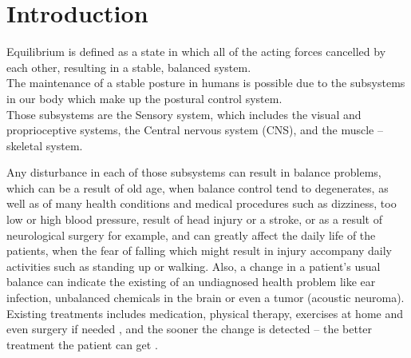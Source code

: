 \documentclass[twoside]{ctuthesis}
\theoremstyle{plain}
\theoremstyle{definition}
\theoremstyle{note}
\begin{document}
\maketitle

\section{Introduction}

Equilibrium is defined as a state in which all of the acting forces cancelled by each other, resulting in a stable, balanced system\cite{Physio}.\\
The maintenance of a stable posture in humans is possible due to the subsystems in our body which make up the postural control system.\\
Those subsystems are the Sensory system, which includes the visual and proprioceptive systems, the Central nervous system (CNS), and the muscle – skeletal system\cite{Control}.\\\par

Any disturbance in each of those subsystems can result in balance problems, which can be a result of old age, when balance control tend to degenerates\cite{Control}, as well as of many health conditions and medical procedures such as dizziness, too low or high blood pressure, result of head injury or a stroke, or as a result of neurological surgery for example\cite{Healthline}, and can greatly affect the daily life of the patients, when the fear of falling which might result in injury accompany daily activities such as standing up or walking\cite{Control}. Also, a change in a patient's usual balance can indicate the existing of an undiagnosed health problem like ear infection, unbalanced chemicals in the brain or even a tumor (acoustic neuroma)\cite{Healthline}.\\
Existing treatments includes medication, physical therapy, exercises at home and even surgery if needed \cite{Healthline}, and the sooner the change is detected – the better treatment the patient can get \cite{Gait}.\\\par
\end{document}
